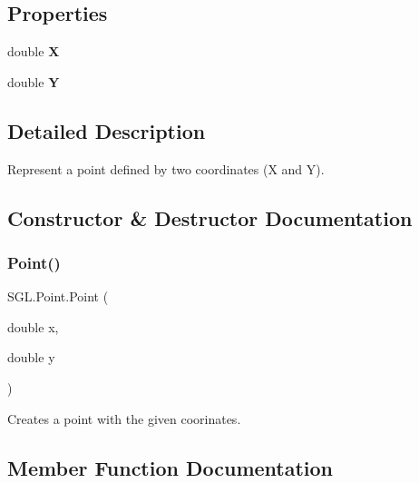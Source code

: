 \subsection*{Properties}
\begin{DoxyCompactItemize}
\item 
\mbox{\label{struct_s_g_l_1_1_point_a762ce7cac4f0081373601711ff2cfde2}} 
double {\bfseries X}
\item 
\mbox{\label{struct_s_g_l_1_1_point_a53213a574ab4d3bbea18216a193b6a54}} 
double {\bfseries Y}
\end{DoxyCompactItemize}


\subsection{Detailed Description}
Represent a point defined by two coordinates (X and Y). 



\subsection{Constructor \& Destructor Documentation}
\mbox{\label{struct_s_g_l_1_1_point_a56c9ba13f3b84483a108ae16fc635cac}} 
\subsubsection{\texorpdfstring{Point()}{Point()}}
{\footnotesize\ttfamily S\+G\+L.\+Point.\+Point (\begin{DoxyParamCaption}\item[{double}]{x,  }\item[{double}]{y }\end{DoxyParamCaption})\hspace{0.3cm}{\ttfamily [inline]}}



Creates a point with the given coorinates. 



\subsection{Member Function Documentation}
\mbox{\label{struct_s_g_l_1_1_point_a88dc45979fe8192615705469fc12f18b}} 
